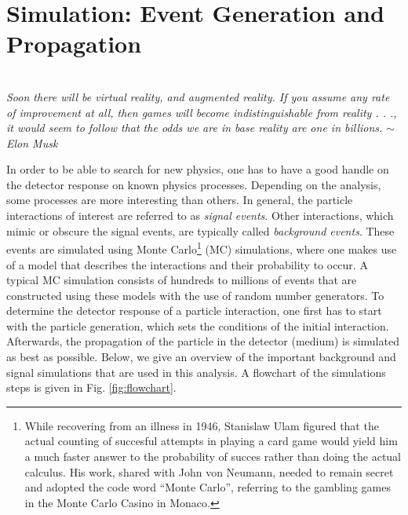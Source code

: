 \chapter{Simulation: Event Generation and Propagation}
\label{ch:simulation}
\begin{flushright}
\textit{\\Soon there will be virtual reality, and augmented reality. If you assume any rate of improvement at all, then games will become indistinguishable from reality . . ., it would seem to follow that the odds we are in base reality are one in billions. $\sim$ Elon Musk\\}
\end{flushright}
In order to be able to search for new physics, one has to have a good handle on the detector response on known physics processes. Depending on the analysis, some processes are more interesting than others. In general, the particle interactions of interest are referred to as \textit{signal events}. Other interactions, which mimic or obscure the signal events, are typically called \textit{background events}. These events are simulated using Monte Carlo\footnote{While recovering from an illness in 1946, Stanislaw Ulam figured that the actual counting of succesful attempts in playing a card game would yield him a much faster answer to the probability of succes rather than doing the actual calculus. His work, shared with John von Neumann, needed to remain secret and adopted the code word ``Monte Carlo'', referring to the gambling games in the Monte Carlo Casino in Monaco.} (MC) simulations, where one makes use of a model that describes the interactions and their probability to occur. A typical MC simulation consists of hundreds to millions of events that are constructed using these models with the use of random number generators. To determine the detector response of a particle interaction, one first has to start with the particle generation, which sets the conditions of the initial interaction. Afterwards, the propagation of the particle in the detector (medium) is simulated as best as possible. Below, we give an overview of the important background and signal simulations that are used in this analysis. A flowchart of the simulations steps is given in Fig. \ref{fig:flowchart}.

